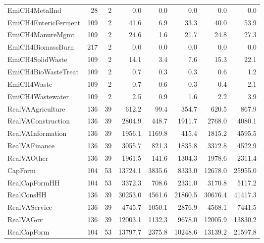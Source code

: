 {\begin{tabular}[t]{lrrrrrrr}
EmiCH4MetalInd & 28 & 2 & \num{0.0} & \num{0.0} & \num{0.0} & \num{0.0} & \num{0.0}\\
EmiCH4EntericFerment & 109 & 2 & \num{41.6} & \num{6.9} & \num{33.3} & \num{40.0} & \num{53.9}\\
EmiCH4ManureMgmt & 109 & 2 & \num{24.6} & \num{1.6} & \num{21.7} & \num{24.8} & \num{27.3}\\
EmiCH4BiomassBurn & 217 & 2 & \num{0.0} & \num{0.0} & \num{0.0} & \num{0.0} & \num{0.0}\\
EmiCH4SolidWaste & 109 & 2 & \num{14.1} & \num{3.4} & \num{7.6} & \num{15.3} & \num{22.1}\\
EmiCH4BioWasteTreat & 109 & 2 & \num{0.7} & \num{0.3} & \num{0.3} & \num{0.6} & \num{1.2}\\
EmiCH4Waste & 109 & 2 & \num{0.7} & \num{0.6} & \num{0.3} & \num{0.4} & \num{2.1}\\
EmiCH4Wastewater & 109 & 2 & \num{2.5} & \num{0.9} & \num{1.6} & \num{2.2} & \num{3.9}\\
RealVAAgriculture & 136 & 39 & \num{612.2} & \num{99.4} & \num{354.7} & \num{620.5} & \num{867.9}\\
RealVAConstruction & 136 & 39 & \num{2804.9} & \num{448.7} & \num{1911.7} & \num{2768.0} & \num{4080.1}\\
RealVAInformation & 136 & 39 & \num{1956.1} & \num{1169.8} & \num{415.4} & \num{1815.2} & \num{4595.5}\\
RealVAFinance & 136 & 39 & \num{3055.7} & \num{821.3} & \num{1835.8} & \num{3372.8} & \num{4522.9}\\
RealVAOther & 136 & 39 & \num{1961.5} & \num{141.6} & \num{1304.3} & \num{1978.6} & \num{2311.4}\\
CapForm & 104 & 53 & \num{13724.1} & \num{3835.6} & \num{8333.0} & \num{12678.0} & \num{25955.0}\\
RealCapFormHH & 104 & 53 & \num{3372.3} & \num{708.6} & \num{2331.0} & \num{3170.8} & \num{5117.2}\\
RealConsHH & 136 & 39 & \num{30253.0} & \num{4561.6} & \num{21860.5} & \num{30676.4} & \num{41417.3}\\
RealVAService & 136 & 39 & \num{4745.7} & \num{1050.1} & \num{2876.9} & \num{4568.1} & \num{7441.5}\\
RealVAGov & 136 & 39 & \num{12003.1} & \num{1132.3} & \num{9678.0} & \num{12005.9} & \num{13830.2}\\
RealCapForm & 104 & 53 & \num{13797.7} & \num{2375.8} & \num{10248.6} & \num{13139.2} & \num{21597.8}\\

\end{tabular}}
